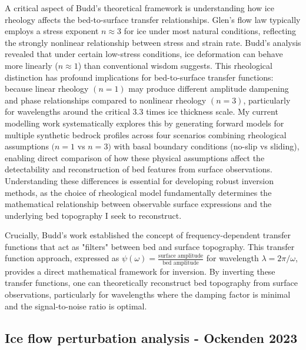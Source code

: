 A critical aspect of Budd's theoretical framework is understanding how ice rheology affects the bed-to-surface transfer relationships. Glen's flow law typically employs a stress exponent $n\approx 3$ for ice under most natural conditions, reflecting the strongly nonlinear relationship between stress and strain rate. Budd's analysis revealed that under certain low-stress conditions, ice deformation can behave more linearly ($n\approx 1$) than conventional wisdom suggests. 
This rheological distinction has profound implications for bed-to-surface transfer functions: because linear rheology $(n = 1)$ may produce different amplitude dampening and phase relationships compared to nonlinear rheology $(n = 3)$, particularly for wavelengths around the critical 3.3 times ice thickness scale.
My current modelling work systematically explores this by generating forward models for multiple synthetic bedrock profiles across four scenarios combining rheological assumptions $(n = 1$ vs $n = 3)$ with basal boundary conditions (no-slip vs sliding), enabling direct comparison of how these physical assumptions affect the detectability and reconstruction of bed features from surface observations. Understanding these differences is essential for developing robust inversion methods, as the choice of rheological model fundamentally determines the mathematical relationship between observable surface expressions and the underlying bed topography I seek to reconstruct.

Crucially, Budd's work established the concept of frequency-dependent transfer functions that act as "filters" between bed and surface topography. This transfer function approach, expressed as $\psi(\omega) = \frac{\text{surface amplitude}}{\text{bed amplitude}}$ for wavelength $\lambda = 2\pi/\omega$, provides a direct mathematical framework for inversion. By inverting these transfer functions, one can theoretically reconstruct bed topography from surface observations, particularly for wavelengths where the damping factor is minimal and the signal-to-noise ratio is optimal.

\subsection{Ice flow perturbation analysis - Ockenden 2023}

